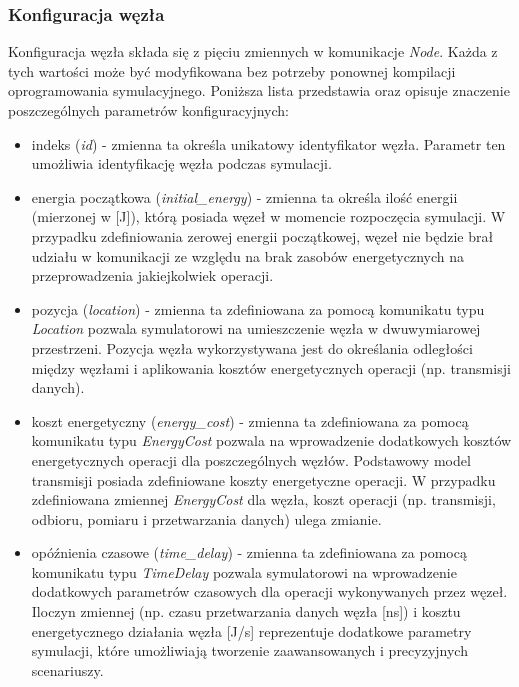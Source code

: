 \documentclass[a4paper,12pt,twoside,openany]{report}
\begin{document}
\subsubsection{Konfiguracja węzła}

Konfiguracja węzła składa się z pięciu zmiennych w komunikacje \textit{Node}. Każda z tych wartości może być modyfikowana bez potrzeby
ponownej kompilacji oprogramowania symulacyjnego. Poniższa lista przedstawia oraz opisuje znaczenie poszczególnych parametrów konfiguracyjnych:

\begin{itemize}
 \item indeks (\textit{id}) - zmienna ta określa unikatowy identyfikator węzła. Parametr ten umożliwia identyfikację węzła podczas symulacji.
 \item energia początkowa (\textit{initial\_energy}) - zmienna ta określa ilość energii (mierzonej w [J]), którą posiada węzeł w momencie rozpoczęcia symulacji.
       W przypadku zdefiniowania zerowej energii początkowej, węzeł nie będzie brał udziału w komunikacji ze względu na brak zasobów energetycznych na
       przeprowadzenia jakiejkolwiek operacji.
 \item pozycja (\textit{location}) - zmienna ta zdefiniowana za pomocą komunikatu typu \textit{Location} pozwala symulatorowi na umieszczenie węzła w dwuwymiarowej przestrzeni.
       Pozycja węzła wykorzystywana jest do określania odległości między węzłami i aplikowania kosztów energetycznych operacji (np. transmisji danych).
 \item koszt energetyczny (\textit{energy\_cost}) - zmienna ta zdefiniowana za pomocą komunikatu typu \textit{EnergyCost} pozwala na wprowadzenie dodatkowych kosztów energetycznych
       operacji dla poszczególnych węzłów. Podstawowy model transmisji posiada zdefiniowane koszty energetyczne operacji.
       W przypadku zdefiniowana zmiennej \textit{EnergyCost} dla węzła, koszt operacji (np. transmisji, odbioru, pomiaru i przetwarzania danych) ulega zmianie.
 \item opóźnienia czasowe (\textit{time\_delay}) - zmienna ta zdefiniowana za pomocą komunikatu typu \textit{TimeDelay} pozwala symulatorowi na wprowadzenie dodatkowych parametrów czasowych
       dla operacji wykonywanych przez węzeł. Iloczyn zmiennej (np. czasu przetwarzania danych węzła [ns]) i kosztu energetycznego działania węzła [J/s] 
       reprezentuje dodatkowe parametry symulacji, które umożliwiają tworzenie zaawansowanych i precyzyjnych scenariuszy.
\end{itemize}
\end{document}
